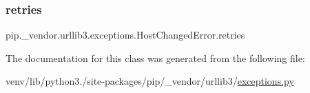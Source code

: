 \subsubsection{\texorpdfstring{retries}{retries}}
{\footnotesize\ttfamily pip.\+\_\+vendor.\+urllib3.\+exceptions.\+Host\+Changed\+Error.\+retries}



The documentation for this class was generated from the following file\+:\begin{DoxyCompactItemize}
\item 
venv/lib/python3./site-\/packages/pip/\+\_\+vendor/urllib3/\hyperlink{pip_2__vendor_2urllib3_2exceptions_8py}{exceptions.\+py}\end{DoxyCompactItemize}
